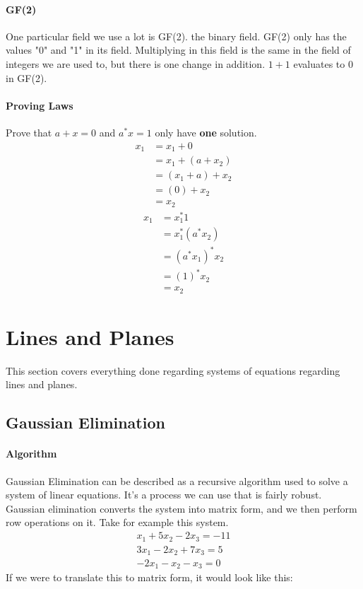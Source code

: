 \paragraph{GF(2)} One particular field we use a lot is GF(2). the binary field. GF(2) only has the values "0" and "1" in its field. Multiplying in this field is the same in the field of integers we are used to, but there is one change in addition. $1 + 1$ evaluates to $0$ in GF(2).
\paragraph{Proving Laws} Prove that $a + x = 0$ and $a^*x = 1$ only have \textbf{one} solution.
\begin{equation}
\begin{split}
	x_1&= x_1 + 0 \\
	&= x_1 + (a + x_2) \\
	&= (x_1 + a) + x_2 \\
	&= (0) + x_2 \\
	&= x_2 
\end{split}
\end{equation}
\begin{equation}
	\begin{split}
	x_1&= x_1^*1 \\
	&= x_1^*(a^*x_2) \\
	&= (a^*x_1)^*x_2 \\
	&= (1)^*x_2 \\
	&= x_2 
	\end{split}
\end{equation}

\section{Lines and Planes}
This section covers everything done regarding systems of equations regarding lines and planes.
\subsection{Gaussian Elimination}
\paragraph{Algorithm} Gaussian Elimination can be described as a recursive algorithm used to solve a system of linear equations. It's a process we can use that is fairly robust. Gaussian elimination converts the system into matrix form, and we then perform row operations on it. Take for example this system.
\begin{equation}
\begin{split}
x_1 + 5x_2 - 2x_3 = -11 \\
3x_1 - 2x_2 + 7x_3 = 5 \\
-2x_1 - x_2 - x_3 = 0
\end{split}
\end{equation}
If we were to translate this to matrix form, it would look like this:

